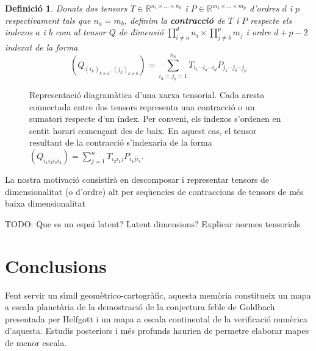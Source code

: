 \documentclass[11pt,a4paper,openright,oneside]{article}
\numberwithin{equation}{section}
\newtheorem{defi}[teo]{Definici\'o}
\theoremstyle{definition}
\begin{document}
\begin{defi}
    Donats dos tensors $T \in \mathbb{R}^{n_1 \times \dots \times n_d}$ i $P \in \mathbb{R}^{m_1 \times \dots \times m_p}$ d'ordres $d$ i $p$
    respectivament tals que $n_a = m_b$, definim la \textbf{contracció} de $T$ i $P$ respecte els indexos $a$ i $b$ com al tensor $Q$ de dimensió
    $\prod_{i \neq a}^{d} n_i \times \prod_{j \neq b}^{p} m_j$ i ordre $d + p - 2$ indexat de la forma
    $$ (Q_{(i_k)_{k \neq a},(j_k)_{k \neq b}}) = \sum_{i_a=j_b=1}^{n_a} T_{i_1\cdots i_a \cdots i_d} P_{j_1 \cdots j_b \cdots j_p}$$
\end{defi}

\begin{figure}[h]
    \begin{center}
        \caption{
            Representació diagramàtica d'una xarxa tensorial. Cada aresta connectada entre dos tensors representa una contracció o un
            sumatori respecte d'un índex. Per conveni, els indexos s'ordenen en sentit horari començant des de baix. En aquest cas, el tensor resultant de la contracció s'indexaria de la forma 
            $(Q_{i_1i_2i_3i_4}) = \sum_{j=1}^{n} T_{i_2i_1j} P_{i_3ji_4}$.
        }
    \end{center}
    \label{fig:tcont}
\end{figure}

La nostra motivació consistirà en descomposar i representar tensors de dimensionalitat (o d'ordre) alt per seqüencies de contraccions de tensors de més baixa dimensionalitat

TODO: Que es un espai latent? Latent dimensions?
Explicar normes tensorials



\newpage

\section{Conclusions}

Fent servir un s\'{\i}mil geom\`etrico-cartogr\`afic, aquesta mem\`oria constitueix un mapa a escala planet\`aria de la demostraci\'o de la conjectura feble de Goldbach presentada per Helfgott i un mapa a escala continental de la verificaci\'o num\`erica d'aquesta. Estudis posteriors i m\'es profunds haurien de permetre elaborar mapes de menor escala.
\end{document}

